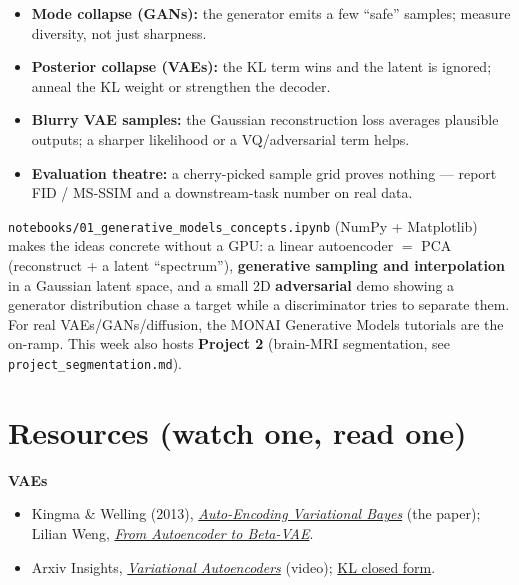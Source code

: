 \documentclass[11pt]{article}
\begin{document}
\begin{notebox}
\begin{itemize}[nosep,leftmargin=*]
  \item \textbf{Mode collapse (GANs):} the generator emits a few ``safe'' samples;
  measure diversity, not just sharpness.
  \item \textbf{Posterior collapse (VAEs):} the KL term wins and the latent is
  ignored; anneal the KL weight or strengthen the decoder.
  \item \textbf{Blurry VAE samples:} the Gaussian reconstruction loss averages
  plausible outputs; a sharper likelihood or a VQ/adversarial term helps.
  \item \textbf{Evaluation theatre:} a cherry-picked sample grid proves nothing ---
  report FID / MS-SSIM and a downstream-task number on real data.
\end{itemize}
\end{notebox}

\begin{keybox}
\texttt{notebooks/01\_generative\_models\_concepts.ipynb} (NumPy + Matplotlib)
makes the ideas concrete without a GPU: a linear autoencoder $=$ PCA
(reconstruct + a latent ``spectrum''), \textbf{generative sampling and
interpolation} in a Gaussian latent space, and a small 2D \textbf{adversarial}
demo showing a generator distribution chase a target while a discriminator tries
to separate them. For real VAEs/GANs/diffusion, the MONAI Generative Models
tutorials are the on-ramp. This week also hosts \textbf{Project 2} (brain-MRI
segmentation, see \texttt{project\_segmentation.md}).
\end{keybox}

\section*{Resources (watch one, read one)}

\textbf{VAEs}
\begin{itemize}[nosep,leftmargin=*]
  \item Kingma \& Welling (2013), \href{https://arxiv.org/abs/1312.6114}{\emph{Auto-Encoding Variational Bayes}} (the paper); Lilian Weng, \href{https://lilianweng.github.io/posts/2018-08-12-vae/}{\emph{From Autoencoder to Beta-VAE}}.
  \item Arxiv Insights, \href{https://www.youtube.com/watch?v=9zKuYvjFFS8}{\emph{Variational Autoencoders}} (video); \href{https://www.statlect.com/fundamentals-of-probability/Kullback-Leibler-divergence}{KL closed form}.
\end{itemize}
\end{document}
